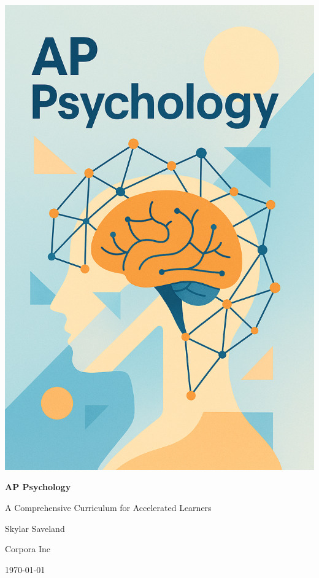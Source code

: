 \thispagestyle{empty}
\noindent
\includegraphics[width=\paperwidth,height=\paperheight]{book-resources/ap-psychology/cover.png}%
\restoregeometry
\newpage

\begin{titlepage}
    \centering
    \vspace*{1in}
    {\Huge\bfseries AP Psychology \par}
    {\Large A Comprehensive Curriculum for Accelerated Learners\par}
    \vspace{1in}
    {\Large Skylar Saveland\par}
    {\Large Corpora Inc\par}
    \vfill
    {\large \today\par}
\end{titlepage}

